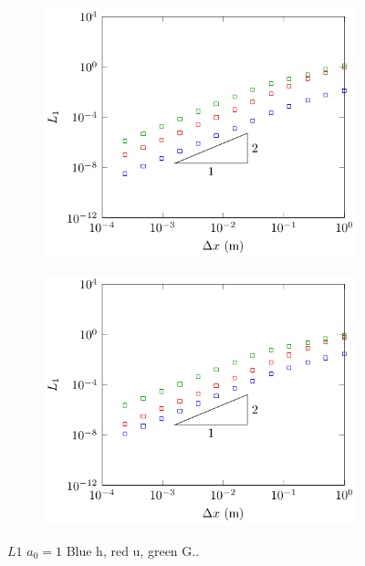 \begin{figure}
	\centering
	\begin{subfigure}{0.5\textwidth}
		\includegraphics[width=\textwidth]{./chp5/figures/Forced/Wet/FDVM2.pdf}
	\end{subfigure}%
	\begin{subfigure}{0.5\textwidth}
		\includegraphics[width=\textwidth]{./chp5/figures/Forced/Wet/FEVM2.pdf}
	\end{subfigure}
	\caption{$L1$ $a_0 = 1$ Blue h, red u, green G..}
	\label{fig:TravGaussWetL1All}
\end{figure}

